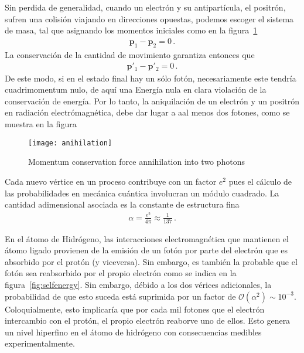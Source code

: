 Sin perdida de generalidad, cuando un electrón y su antipartícula, el positrón, sufren una colisión viajando en direcciones opuestas, podemos escoger el sistema de masa, tal que asignando los momentos iniciales como en la figura~\ref{fig:anihilation}
\begin{align}
  \boldsymbol{p}_1-\boldsymbol{p}_{2}=0\,.
\end{align}
La conservación de la cantidad de movimiento garantiza entonces que
\begin{align}
  \boldsymbol{p}'_1-\boldsymbol{p}'_{2}=0\,.
\end{align}
De este modo, si en el estado final hay un sólo fotón, necesariamente este tendría cuadrimomentum nulo, de aquí una Energía nula  en clara violación de la conservación de energía. Por lo tanto, la aniquilación de un electrón y un positrón en radiación electrómagnética, debe dar lugar a aal menos dos fotones, como se muestra en la figura

\begin{frame}
\begin{figure}
  \centering
  \texttt{[image: anihilation]}
  \caption{Momentum conservation force  annihilation into two photons}
  \label{fig:anihilation}
\end{figure}
\end{frame}

Cada nuevo vértice en un proceso contribuye con un factor $e^{2}$ pues el cálculo de las probabilidades en mecánica cuántica involucran un módulo cuadrado. La cantidad adimensional asociada es la constante de estructura fina
\begin{align}
  \alpha=\frac{e^2}{4\pi}\approx \frac{1}{137}\,.
\end{align}

En el átomo de Hidrógeno, las interacciones electromagnética que mantienen el átomo ligado provienen de la emisión de un fotón por parte del electrón que es absorbido por el protón (y viceversa). Sin embargo, es también la probable que el fotón sea reabsorbido por el propio electrón como se indica en la figura~\ref{fig:selfenergy}. Sin embargo, débido a los dos vérices adicionales, la probabilidad de que esto suceda está suprimida por un factor de $\mathcal{O}({\alpha}^{2})\sim 10^{-3}$. Coloquialmente, esto implicaría que por cada mil fotones que el electrón intercambio con el protón, el propio electrón reaborve uno de ellos. Esto genera un nivel hiperfino en el átomo de hidrógeno con consecuencias medibles experimentalmente. 

